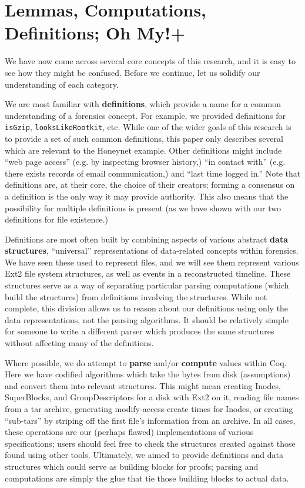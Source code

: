 \documentclass[nocopyrightspace]{sigplanconf}
\begin{document}
\section{Lemmas, Computations, Definitions; Oh My!+}

We have now come across several core concepts of this research, and it is easy
to see how they might be confused. Before we continue, let us solidify our
understanding of each category.

We are most familiar with {\bf definitions}, which provide a name for a common
understanding of a forensics concept. For example, we provided definitions for
{\tt isGzip}, {\tt looksLikeRootkit}, etc. While one of the wider goals of
this research is to provide a set of such common definitions, this paper only
describes several which are relevant to the Honeynet example. Other
definitions might include ``web page access'' (e.g. by inspecting browser
history,) ``in contact with'' (e.g. there exists records of email
communication,) and ``last time logged in.'' Note that definitions are, at
their core, the choice of their creators; forming a consensus on a definition
is the only way it may provide authority. This also means that the possibility
for multiple definitions is present (as we have shown with our two definitions
for file existence.)

Definitions are most often built by combining aspects of various abstract {\bf
data structures}, ``universal'' representations of data-related concepts
within forensics. We have seen these used to represent files, and we will see
them represent various Ext2 file system structures, as well as events in a
reconstructed timeline. These structures serve as a way of separating
particular parsing computations (which build the structures) from definitions
involving the structures. While not complete, this division allows us to
reason about our definitions using only the data representations, not the
parsing algorithms. It should be relatively simple for someone to write a
different parser which produces the same structures without affecting many of
the definitions.


Where possible, we do attempt to {\bf parse} and/or {\bf compute} values
within Coq. Here we have codified algorithms which take the bytes from disk
(assumptions) and convert them into relevant structures. This might mean
creating Inodes, SuperBlocks, and GroupDescriptors for a disk with Ext2 on it,
reading file names from a tar archive, generating modify-access-create times
for Inodes, or creating ``sub-tars'' by striping off the first file's
information from an archive. In all cases, these operations are our (perhaps
flawed) implementations of various specifications; users should feel free to
check the structures created against those found using other tools.
Ultimately, we aimed to provide definitions and data structures which could
serve as building blocks for proofs; parsing and computations are simply the
glue that tie those building blocks to actual data.
\end{document}
